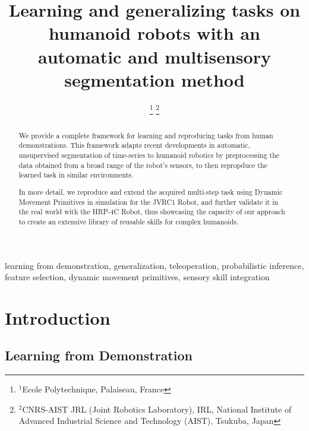 \documentclass[conference]{IEEEtran}
\begin{document}
\title{\textbf{Learning and generalizing tasks on humanoid robots with an automatic and multisensory segmentation method}
}

\author{
\IEEEauthorblockA{}
\and
{}
\IEEEauthorblockA{}
\thanks{$^{1}$Ecole Polytechnique, Palaiseau, France}
\thanks{$^{2}$CNRS-AIST JRL (Joint Robotics Laboratory), IRL, National Institute of Advanced Industrial Science and Technology (AIST), Tsukuba, Japan}
}

\maketitle

\begin{abstract}
We provide a complete framework for learning and reproducing tasks from human demonstrations. This framework adapts recent developments in automatic, unsupervised segmentation of time-series to humanoid robotics by preprocessing the data obtained from a broad range of the robot's sensors, to then repropduce the learned task in similar environments.

In more detail,  we reproduce and extend the acquired multi-step task using Dynamic Movement Primitives in simulation for the JVRC1 Robot, and further validate it in the real world with the HRP-4C Robot, thus showcasing the capacity of our approach to create an extensive library of reusable skills for complex humanoids.
\end{abstract}

\begin{IEEEkeywords}
learning from demonstration, generalization, teleoperation, probabilistic inference, feature selection, dynamic movement primitives, sensory skill integration
\end{IEEEkeywords}

\section{Introduction}
\subsection{Learning from Demonstration}
\end{document}
